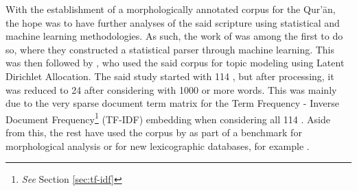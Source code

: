 With the establishment of a morphologically annotated corpus for the Qur'\=an, the hope was to have further analyses of the said scripture using statistical and machine learning methodologies. As such, the work of  was among the first to do so, where they constructed a statistical parser through machine learning. This was then followed by , who used the said corpus for topic modeling using Latent Dirichlet Allocation. The said study started with 114  , but after processing, it was reduced to 24   after considering   with 1000 or more words. This was mainly due to the very sparse document term matrix for the Term Frequency - Inverse Document Frequency\footnote{\textit{See} Section \ref{sec:tf-idf}} (TF-IDF) embedding when considering all 114  . Aside from this, the rest have used the corpus by  as part of a benchmark for morphological analysis or for new lexicographic databases, for example .

